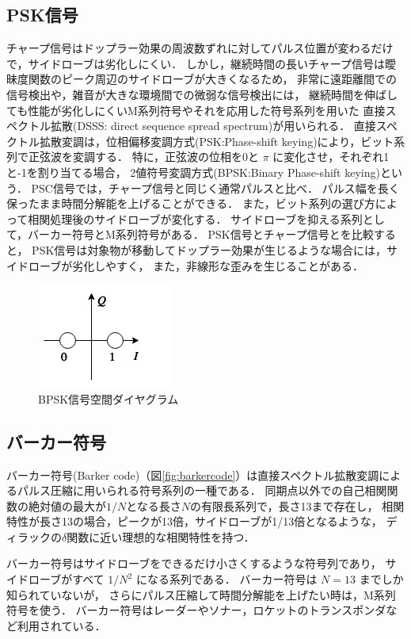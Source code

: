 \subsection{PSK信号}
チャープ信号はドップラー効果の周波数ずれに対してパルス位置が変わるだけで，サイドローブは劣化しにくい．
しかし，継続時間の長いチャープ信号は曖昧度関数のピーク周辺のサイドローブが大きくなるため，
非常に遠距離間での信号検出や，雑音が大きな環境間での微弱な信号検出には，
継続時間を伸ばしても性能が劣化しにくいM系列符号やそれを応用した符号系列を用いた
直接スペクトル拡散(DSSS: direct sequence spread spectrum)が用いられる．
直接スペクトル拡散変調は，位相偏移変調方式(PSK:Phase-shift keying)により，ビット系列で正弦波を変調する．
特に，正弦波の位相を0と $\pi$ に変化させ，それぞれ1と-1を割り当てる場合，
2値符号変調方式(BPSK:Binary Phase-shift keying)という．
PSC信号では，チャープ信号と同じく通常パルスと比べ．
パルス幅を長く保ったまま時間分解能を上げることができる．
また，ビット系列の選び方によって相関処理後のサイドローブが変化する．
サイドローブを抑える系列として，バーカー符号とM系列符号がある．
PSK信号とチャープ信号とを比較すると，
PSK信号は対象物が移動してドップラー効果が生じるような場合には，サイドローブが劣化しやすく，
また，非線形な歪みを生じることがある．

\begin{figure}[p]\centering
\includegraphics[clip,width=0.27\hsize]{img/chirp_qi.png}
\caption{BPSK信号空間ダイヤグラム}\label{fig:chirpqi}
\end{figure}

\subsection{バーカー符号}
バーカー符号(Barker code)（図\ref{fig:barkercode}）は直接スペクトル拡散変調によるパルス圧縮に用いられる符号系列の一種である．
同期点以外での自己相関関数の絶対値の最大が$1/N$となる長さ$N$の有限長系列で，長さ13まで存在し，
相関特性が長さ13の場合，ピークが13倍，サイドローブが1/13倍となるような，
ディラックの$\delta$関数に近い理想的な相関特性を持つ．

バーカー符号はサイドローブをできるだけ小さくするような符号列であり，
サイドローブがすべて $1/N^2$ になる系列である．
バーカー符号は $N=13$ までしか知られていないが，
さらにパルス圧縮して時間分解能を上げたい時は，M系列符号を使う．
バーカー符号はレーダーやソナー，ロケットのトランスポンダ\cite{高野忠00}など利用されている．

